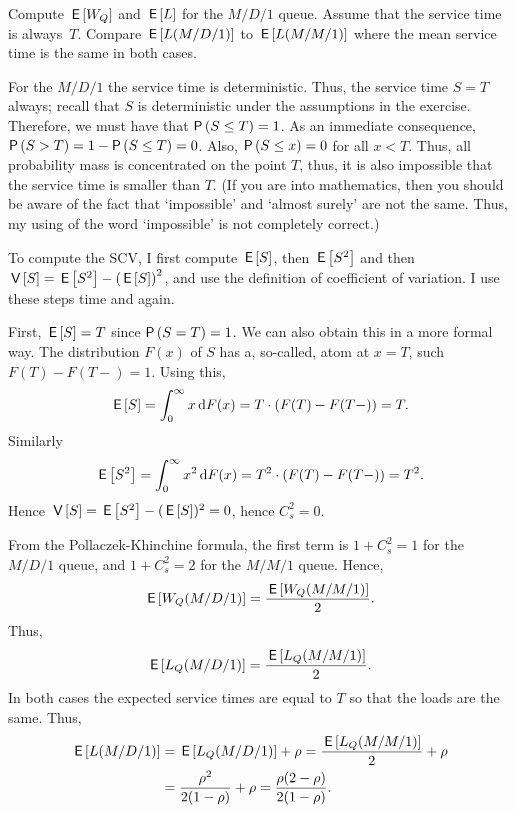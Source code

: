 \begin{exercise}[\faCalculator]
  Compute $\,\mathsf{E}\left[W_Q\right]$ and $\,\mathsf{E}\left[L\right]$ for the $M/D/1$ queue. Assume that the
  service time is always~$T$. Compare $\,\mathsf{E}\left[L(M/D/1)\right]$ to $\,\mathsf{E}\left[L(M/M/1)\right]$
  where the mean service time is the same in both cases.
\begin{solution}
  For the $M/D/1$ the service time is deterministic. Thus, the service time $S=T$ always; recall that $S$ is   deterministic under the assumptions in the exercise. Therefore, we
  must have that $\P{S\leq T} = 1$. As an immediate consequence,
  $\P{S>T} = 1-\P{S\leq T} = 0$. Also, $\P{S \leq x} = 0$ for all
  $x<T$. Thus, all probability mass is concentrated on the point $T$,
  thus, it is also impossible that the service time is smaller than
  $T$.  (If you are into mathematics, then you should be aware of the fact
  that `impossible' and `almost surely' are not the same. Thus, my
  using of the word `impossible' is not completely correct.)

  To compute the SCV, I first compute $\,\mathsf{E}\left[S\right]$, then $\,\mathsf{E}\left[S^2\right]$ and then
  $\,\mathsf{V}\left[S\right] = \,\mathsf{E}\left[S^2\right] - \left(\,\mathsf{E}\left[S\right]\right)^2$, and use the definition of
  coefficient of variation. I use these steps time and again.

  First, $\,\mathsf{E}\left[S\right] = T$ since $\P{S=T} =1$. We can also obtain this in a
  more formal way. The distribution $F(x)$ of $S$ has a, so-called, atom at
  $x=T$, such $F(T) - F(T-) =1$.  Using this,
  \begin{equation*}
    \,\mathsf{E}\left[S\right] = \int_0^\infty x \,\text{d}F(x) = T\cdot (F(T)-F(T-)) = T.
  \end{equation*}
Similarly
\begin{equation*}
\,\mathsf{E}\left[S^2\right] = \int_0^\infty x^2 \,\text{d}F(x) = T^2\cdot (F(T)-F(T-)) = T^2.
\end{equation*}
Hence $\,\mathsf{V}\left[S\right] = \,\mathsf{E}\left[S^2\right] - (\,\mathsf{E}\left[S\right])^2 = 0$, hence $C_s^2 = 0$.

From the Pollaczek-Khinchine formula, the first term is $1+C_s^2=1$ for the $M/D/1$ queue, and $1+C_s^2=2$ for the $M/M/1$ queue. Hence, 
  \begin{equation*}
\,\mathsf{E}\left[W_Q(M/D/1)\right] = \frac{\,\mathsf{E}\left[W_Q(M/M/1)\right]}2.
  \end{equation*}
Thus, 
\begin{equation*}
 \,\mathsf{E}\left[L_Q(M/D/1)\right] = \frac{\,\mathsf{E}\left[L_Q(M/M/1)\right]}2.    
\end{equation*}
In both cases the expected service times are equal to $T$ so that the loads are the same. Thus, 
\begin{equation*}
  \begin{split}
 \,\mathsf{E}\left[L(M/D/1)\right] &= \,\mathsf{E}\left[L_Q(M/D/1)\right] +\rho = \frac{\,\mathsf{E}\left[L_Q(M/M/1)\right]}2 + \rho \\
&= \frac{\rho^2}{2(1-\rho)} + \rho=\frac{\rho(2-\rho)} {2(1-\rho)}.
  \end{split}
\end{equation*}
\end{solution}
\end{exercise}


